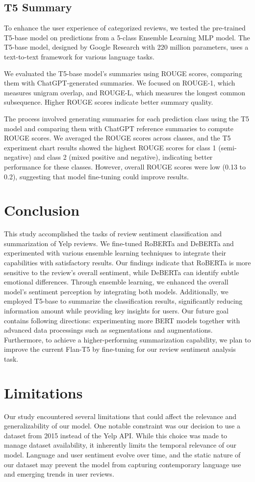 \documentclass[11pt]{article}
\begin{document}
\subsection{T5 Summary}
To enhance the user experience of categorized reviews, we tested the pre-trained T5-base model on predictions from a 5-class Ensemble Learning MLP model. The T5-base model, designed by Google Research with 220 million parameters, uses a text-to-text framework for various language tasks.

We evaluated the T5-base model's summaries using ROUGE scores, comparing them with ChatGPT-generated summaries. We focused on ROUGE-1, which measures unigram overlap, and ROUGE-L, which measures the longest common subsequence. Higher ROUGE scores indicate better summary quality.

The process involved generating summaries for each prediction class using the T5 model and comparing them with ChatGPT reference summaries to compute ROUGE scores. We averaged the ROUGE scores across classes, and the T5 experiment chart results showed the highest ROUGE scores for class 1 (semi-negative) and class 2 (mixed positive and negative), indicating better performance for these classes. However, overall ROUGE scores were low (0.13 to 0.2), suggesting that model fine-tuning could improve results.

\section{Conclusion}
This study accomplished the tasks of review sentiment classification and summarization of Yelp reviews. We fine-tuned RoBERTa and DeBERTa and experimented with various ensemble learning techniques to integrate their capabilities with satisfactory results. Our findings indicate that RoBERTa is more sensitive to the review’s overall sentiment, while DeBERTa can identify subtle emotional differences. Through ensemble learning, we enhanced the overall model's sentiment perception by integrating both models. Additionally, we employed T5-base to summarize the classification results, significantly reducing information amount while providing key insights for users. Our future goal contains following directions: experimenting more BERT models together with advanced data processings such as segmentations and augmentations. Furthermore, to achieve a higher-performing summarization capability, we plan to improve the current Flan-T5 by fine-tuning for our review sentiment analysis task. 

\section*{Limitations}
Our study encountered several limitations that could affect the relevance and generalizability of our model. One notable constraint was our decision to use a dataset from 2015 instead of the Yelp API. While this choice was made to manage dataset availability, it inherently limits the temporal relevance of our model. Language and user sentiment evolve over time, and the static nature of our dataset may prevent the model from capturing contemporary language use and emerging trends in user reviews.
\end{document}
